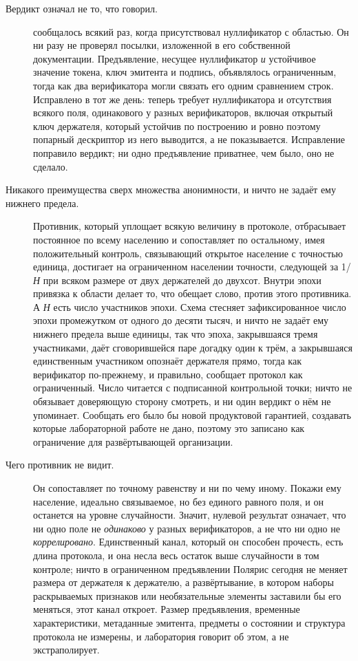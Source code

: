 \begin{description}
  \item[Вердикт означал не то, что говорил.]  сообщалось всякий раз, когда
    присутствовал нуллификатор с областью. Он ни разу не проверял посылки, изложенной в его
    собственной документации. Предъявление, несущее нуллификатор \emph{и} устойчивое значение
    токена, ключ эмитента и подпись, объявлялось ограниченным, тогда как два верификатора могли
    связать его одним сравнением строк. Исправлено в тот же день:  теперь требует
    нуллификатора и отсутствия всякого поля, одинакового у разных верификаторов, включая открытый
    ключ держателя, который устойчив по построению и ровно поэтому попарный дескриптор из него
    выводится, а не показывается. Исправление поправило вердикт; ни одно предъявление приватнее,
    чем было, оно не сделало.
  \item[Никакого преимущества сверх множества анонимности, и ничто не задаёт ему нижнего предела.]
    Противник, который уплощает всякую величину в протоколе, отбрасывает постоянное по всему
    населению и сопоставляет по остальному, имея положительный контроль, связывающий открытое
    население с точностью единица, достигает на ограниченном населении точности, следующей за
    1/\textit{Н} при всяком размере от двух держателей до двухсот. Внутри эпохи привязка к области делает
    то, что обещает слово, против этого противника. А \textit{Н} есть число участников эпохи. Схема
    стесняет зафиксированное число эпохи промежутком от одного до десяти тысяч, и ничто не задаёт
    ему нижнего предела выше единицы, так что эпоха, закрывшаяся тремя участниками, даёт
    сговорившейся паре догадку один к трём, а закрывшаяся единственным участником опознаёт
    держателя прямо, тогда как верификатор по-прежнему, и правильно, сообщает протокол как
    ограниченный. Число читается с подписанной контрольной точки; ничто не обязывает доверяющую
    сторону смотреть, и ни один вердикт о нём не упоминает. Сообщать его было бы новой продуктовой
    гарантией, создавать которые лабораторной работе не дано, поэтому это записано как ограничение
    для развёртывающей организации.
  \item[Чего противник не видит.] Он сопоставляет по точному равенству и ни по чему иному.
    Покажи ему население, идеально связываемое, но без единого равного поля, и он останется на
    уровне случайности. Значит, нулевой результат означает, что ни одно поле не \emph{одинаково} у
    разных верификаторов, а не что ни одно не \emph{коррелировано}. Единственный канал, который он
    способен прочесть, есть длина протокола, и она несла весь остаток выше случайности в том
    контроле; ничто в ограниченном предъявлении Полярис сегодня не меняет размера от держателя к
    держателю, а развёртывание, в котором наборы раскрываемых признаков или необязательные
    элементы заставили бы его меняться, этот канал откроет. Размер предъявления, временные
    характеристики, метаданные эмитента, предметы о состоянии и структура протокола не измерены, и
    лаборатория говорит об этом, а не экстраполирует.
\end{description}

